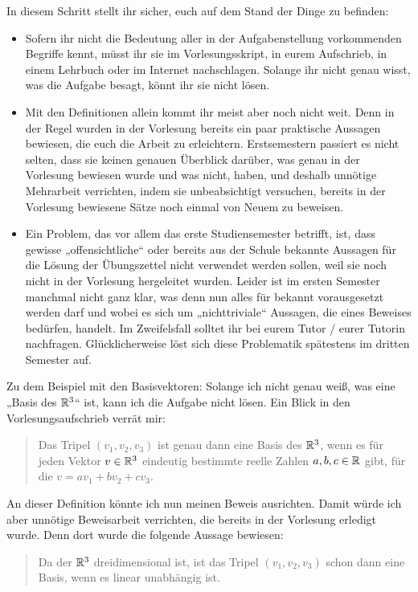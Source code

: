 \begin{phaseone}[Recherche]
    In diesem Schritt stellt ihr sicher, euch auf dem Stand der Dinge zu befinden:
    \begin{itemize}
        \item Sofern ihr nicht die Bedeutung aller in der Aufgabenstellung vorkommenden Begriffe kennt, müsst ihr sie im Vorlesungsskript, in eurem Aufschrieb, in einem Lehrbuch oder im Internet nachschlagen. Solange ihr nicht genau wisst, was die Aufgabe besagt, könnt ihr sie nicht lösen.
        \item Mit den Definitionen allein kommt ihr meist aber noch nicht weit. Denn in der Regel wurden in der Vorlesung bereits ein paar praktische Aussagen bewiesen, die euch die Arbeit zu erleichtern. Erstsemestern passiert es nicht selten, dass sie keinen genauen Überblick darüber, was genau in der Vorlesung bewiesen wurde und was nicht, haben, und deshalb unnötige Mehrarbeit verrichten, indem sie unbeabsichtigt versuchen, bereits in der Vorlesung bewiesene Sätze noch einmal von Neuem zu beweisen.
        \item Ein Problem, das vor allem das erste Studiensemester betrifft, ist, dass gewisse „offensichtliche“ oder bereits aus der Schule bekannte Aussagen für die Lösung der Übungszettel nicht verwendet werden sollen, weil sie noch nicht in der Vorlesung hergeleitet wurden. Leider ist im ersten Semester manchmal nicht ganz klar, was denn nun alles für bekannt vorausgesetzt werden darf und wobei es sich um „nichttriviale“ Aussagen, die eines Beweises bedürfen, handelt. Im Zweifelsfall solltet ihr bei eurem Tutor / eurer Tutorin nachfragen. Glücklicherweise löst sich diese Problematik spätestens im dritten Semester auf.
    \end{itemize}
    Zu dem Beispiel mit den Basisvektoren: Solange ich nicht genau weiß, was eine „Basis des $\mathbb R^3$“ ist, kann ich die Aufgabe nicht lösen. Ein Blick in den Vorlesungsaufschrieb verrät mir:
    \begin{quote}
        Das Tripel $(v_1,v_2,v_3)$ ist genau dann eine Basis des $\mathbb R^3$, wenn es für jeden Vektor $v\in \mathbb R^3$ eindeutig bestimmte reelle Zahlen $a,b,c\in \mathbb R$ gibt, für die $v=av_1+bv_2+cv_3$.
    \end{quote}
    An dieser Definition könnte ich nun meinen Beweis ausrichten. Damit würde ich aber unnötige Beweisarbeit verrichten, die bereits in der Vorlesung erledigt wurde. Denn dort wurde die folgende Aussage bewiesen:
    \begin{quote}
        Da der $\mathbb R^3$ dreidimensional ist, ist das Tripel $(v_1,v_2,v_3)$ schon dann eine Basis, wenn es linear unabhängig ist.

\end{quote}
\end{phaseone}
